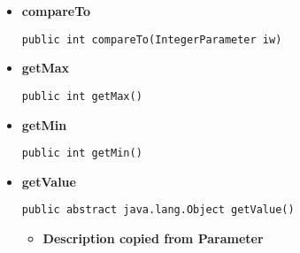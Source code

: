 {{{{{{\begin{itemize}
{\begin{itemize}
{Let the visitor visit this parameter.
}
\item{
{\bf  Parameters}
  \begin{itemize}
   \item{
\texttt{visitor} -- The visitor to visit}
  \end{itemize}
}%
\end{itemize}
}%
\item{ 
{\bf  compareTo}\\
\begin{lstlisting}[frame=none]
public int compareTo(IntegerParameter iw)\end{lstlisting} %
}%
\item{ 
{\bf  getMax}\\
\begin{lstlisting}[frame=none]
public int getMax()\end{lstlisting} %
}%
\item{ 
{\bf  getMin}\\
\begin{lstlisting}[frame=none]
public int getMin()\end{lstlisting} %
}%
\item{ 
{\bf  getValue}\\
\begin{lstlisting}[frame=none]
public abstract java.lang.Object getValue()\end{lstlisting} %
\begin{itemize}
\item{
{\bf  Description copied from Parameter{\small {}} }

}
\end{itemize}}
\end{itemize}}}}}}}

